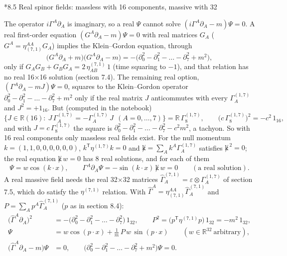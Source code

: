 \documentclass[10pt,a4paper]{article}
\makeatletter
\renewcommand\subsection{\@startsection{subsection}{2}{\z@}{-3.25ex\@plus -1ex \@minus -.2ex}{1.5ex \@plus .2ex}{\normalfont\large\bfseries\raggedright}}
\makeatother
\begin{document}
\subsection*{8.5 Real spinor fields: massless with 16 components, massive with 32}
The operator $i\Gamma^{A}\partial_A$ is imaginary, so a real $\Psi$ cannot solve $(i\Gamma^{A}\partial_A-m)\Psi=0$. A real first-order equation $(G^{A}\partial_A-m)\Psi=0$ with real matrices $G_A$ ($G^{A}=\eta_{(7,1)}^{AA}G_A$) implies the Klein–Gordon equation, through
\begin{equation*}
\big(G^{A}\partial_A+m\big)\big(G^{A}\partial_A-m\big)=-\big(\partial_0^2-\partial_1^2-\dots-\partial_7^2+m^2\big),
\end{equation*}
only if $G_AG_B+G_BG_A=2\,\eta^{(7,1)}_{AB}\,1$ (time squaring to $-1$), and that relation has no real 16×16 solution (section 7.4). The remaining real option, $(\Gamma^{A}\partial_A-mJ)\Psi=0$, squares to the Klein–Gordon operator $\partial_0^2-\partial_1^2-\dots-\partial_7^2+m^2$ only if the real matrix $J$ anticommutes with every $\Gamma^{(1,7)}_A$ and $J^2=+1_{16}$. But (computed in the notebook)
\begin{equation*}
\big\lbrace J\in\mathbb R(16):\ J\,\Gamma^{(1,7)}_A=-\Gamma^{(1,7)}_A\,J\ \ (A=0,\dots,7)\big\rbrace=\mathbb R\,\Gamma^{(1,7)}_8,\qquad \big(c\,\Gamma^{(1,7)}_8\big)^2=-c^2\,1_{16},
\end{equation*}
and with $J=c\,\Gamma^{(1,7)}_8$ the square is $\partial_0^2-\partial_1^2-\dots-\partial_7^2-c^2m^2$, a tachyon. So with 16 real components only massless real fields exist. For the null momentum $k=(1,1,0,0,0,0,0,0)$, $k^{\mathsf T}\eta^{(1,7)}k=0$ and $\not k=\sum_Ak^A\Gamma^{(1,7)}_A$ satisfies $\not k^{\,2}=0$; the real equation $\not k\,w=0$ has 8 real solutions, and for each of them
\begin{equation*}
\Psi=w\cos(k\cdot x),\qquad \Gamma^{A}\partial_A\Psi=-\sin(k\cdot x)\,\not k\,w=0\qquad(\text{a real solution}).
\end{equation*}
A real massive field needs the real 32×32 matrices $\widehat\Gamma^{(7,1)}_A=\varepsilon\otimes\Gamma^{(1,7)}_A$ of section 7.5, which do satisfy the $\eta^{(7,1)}$ relation. With $\widehat\Gamma^{A}=\eta_{(7,1)}^{AA}\widehat\Gamma^{(7,1)}_A$ and $P=\sum_Ap^A\widehat\Gamma^{(7,1)}_A$ ($p$ as in section 8.4):
\begin{align*}
\big(\widehat\Gamma^{A}\partial_A\big)^2&=-\big(\partial_0^2-\partial_1^2-\dots-\partial_7^2\big)\,1_{32},\qquad P^2=\big(p^{\mathsf T}\eta^{(7,1)}p\big)\,1_{32}=-m^2\,1_{32}, \\
\Psi&=w\cos(p\cdot x)+\tfrac1m\,P\,w\,\sin(p\cdot x)\qquad(w\in\mathbb R^{32}\ \text{arbitrary}), \\
\big(\widehat\Gamma^{A}\partial_A-m\big)\Psi&=0,\qquad \big(\partial_0^2-\partial_1^2-\dots-\partial_7^2+m^2\big)\Psi=0.
\end{align*}
\end{document}
